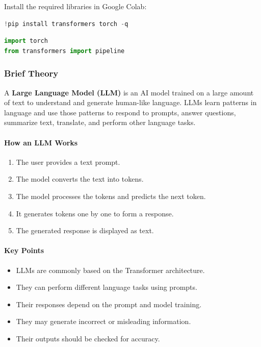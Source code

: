 \documentclass[a4paper,11pt]{article}
\begin{document}
\begin{itemize}
Install the required libraries in Google Colab:
\begin{lstlisting}[language=Python, caption={Install transformers and torch}]
!pip install transformers torch -q
\end{lstlisting}

\begin{lstlisting}[language=Python, caption={Required Imports}]
import torch
from transformers import pipeline
\end{lstlisting}

\subsubsection{Brief Theory}
A \textbf{Large Language Model (LLM)} is an AI model trained on a large amount of text to understand and generate human-like language. LLMs learn patterns in language and use those patterns to respond to prompts, answer questions, summarize text, translate, and perform other language tasks.

\paragraph{How an LLM Works}
\begin{enumerate}
    \item The user provides a text prompt.
    \item The model converts the text into tokens.
    \item The model processes the tokens and predicts the next token.
    \item It generates tokens one by one to form a response.
    \item The generated response is displayed as text.
\end{enumerate}

\paragraph{Key Points}
\begin{itemize}
    \item LLMs are commonly based on the Transformer architecture.
    \item They can perform different language tasks using prompts.
    \item Their responses depend on the prompt and model training.
    \item They may generate incorrect or misleading information.
    \item Their outputs should be checked for accuracy.
\end{itemize}


\end{itemize}
\end{document}
